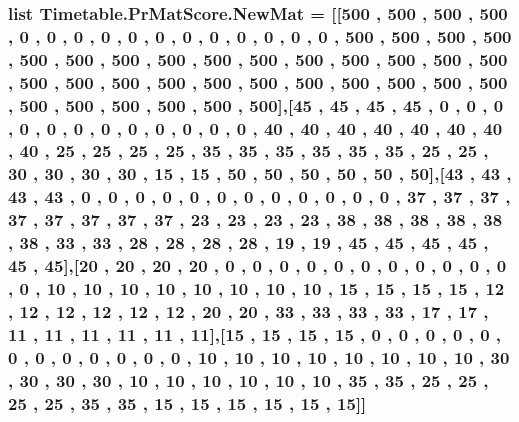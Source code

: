 \subsubsection[{\texorpdfstring{New\+Mat}{NewMat}}]{\setlength{\rightskip}{0pt plus 5cm}list Timetable.\+Pr\+Mat\+Score.\+New\+Mat = \mbox{[}\mbox{[}500 , 500 , 500 , 500 , 0 , 0 , 0 , 0 , 0 , 0 , 0 , 0 , 0 , 0 , 0 , 0 , 500 , 500 , 500 , 500 , 500 , 500 , 500 , 500 , 500 , 500 , 500 , 500 , 500 , 500 , 500 , 500 , 500 , 500 , 500 , 500 , 500 , 500 , 500 , 500 , 500 , 500 , 500 , 500 , 500 , 500 , 500 , 500\mbox{]},\mbox{[}45 , 45 , 45 , 45 , 0 , 0 , 0 , 0 , 0 , 0 , 0 , 0 , 0 , 0 , 0 , 0 , 40 , 40 , 40 , 40 , 40 , 40 , 40 , 40 , 25 , 25 , 25 , 25 , 35 , 35 , 35 , 35 , 35 , 35 , 25 , 25 , 30 , 30 , 30 , 30 , 15 , 15 , 50 , 50 , 50 , 50 , 50 , 50\mbox{]},\mbox{[}43 , 43 , 43 , 43 , 0 , 0 , 0 , 0 , 0 , 0 , 0 , 0 , 0 , 0 , 0 , 0 , 37 , 37 , 37 , 37 , 37 , 37 , 37 , 37 , 23 , 23 , 23 , 23 , 38 , 38 , 38 , 38 , 38 , 38 , 33 , 33 , 28 , 28 , 28 , 28 , 19 , 19 , 45 , 45 , 45 , 45 , 45 , 45\mbox{]},\mbox{[}20 , 20 , 20 , 20 , 0 , 0 , 0 , 0 , 0 , 0 , 0 , 0 , 0 , 0 , 0 , 0 , 10 , 10 , 10 , 10 , 10 , 10 , 10 , 10 , 15 , 15 , 15 , 15 , 12 , 12 , 12 , 12 , 12 , 12 , 20 , 20 , 33 , 33 , 33 , 33 , 17 , 17 , 11 , 11 , 11 , 11 , 11 , 11\mbox{]},\mbox{[}15 , 15 , 15 , 15 , 0 , 0 , 0 , 0 , 0 , 0 , 0 , 0 , 0 , 0 , 0 , 0 , 10 , 10 , 10 , 10 , 10 , 10 , 10 , 10 , 30 , 30 , 30 , 30 , 10 , 10 , 10 , 10 , 10 , 10 , 35 , 35 , 25 , 25 , 25 , 25 , 35 , 35 , 15 , 15 , 15 , 15 , 15 , 15\mbox{]}\mbox{]}}\hypertarget{namespaceTimetable_1_1PrMatScore_a0eddb11627335d58873eb923b54cdb34}{}\label{namespaceTimetable_1_1PrMatScore_a0eddb11627335d58873eb923b54cdb34}
